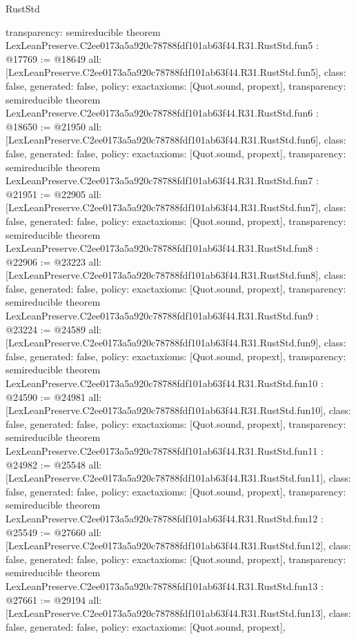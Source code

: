 \begin{lexlean}{RustStd}
\begin{coremodule}
{  transparency: semireducible
}
theorem LexLeanPreserve.C2ee0173a5a920c78788fdf101ab63f44.R31.RustStd.fun5 : @17769 := @18649 {
  all: [LexLeanPreserve.C2ee0173a5a920c78788fdf101ab63f44.R31.RustStd.fun5],
  class: false,
  generated: false,
  policy: exact{axioms: [Quot.sound, propext]},
  transparency: semireducible
}
theorem LexLeanPreserve.C2ee0173a5a920c78788fdf101ab63f44.R31.RustStd.fun6 : @18650 := @21950 {
  all: [LexLeanPreserve.C2ee0173a5a920c78788fdf101ab63f44.R31.RustStd.fun6],
  class: false,
  generated: false,
  policy: exact{axioms: [Quot.sound, propext]},
  transparency: semireducible
}
theorem LexLeanPreserve.C2ee0173a5a920c78788fdf101ab63f44.R31.RustStd.fun7 : @21951 := @22905 {
  all: [LexLeanPreserve.C2ee0173a5a920c78788fdf101ab63f44.R31.RustStd.fun7],
  class: false,
  generated: false,
  policy: exact{axioms: [Quot.sound, propext]},
  transparency: semireducible
}
theorem LexLeanPreserve.C2ee0173a5a920c78788fdf101ab63f44.R31.RustStd.fun8 : @22906 := @23223 {
  all: [LexLeanPreserve.C2ee0173a5a920c78788fdf101ab63f44.R31.RustStd.fun8],
  class: false,
  generated: false,
  policy: exact{axioms: [Quot.sound, propext]},
  transparency: semireducible
}
theorem LexLeanPreserve.C2ee0173a5a920c78788fdf101ab63f44.R31.RustStd.fun9 : @23224 := @24589 {
  all: [LexLeanPreserve.C2ee0173a5a920c78788fdf101ab63f44.R31.RustStd.fun9],
  class: false,
  generated: false,
  policy: exact{axioms: [Quot.sound, propext]},
  transparency: semireducible
}
theorem LexLeanPreserve.C2ee0173a5a920c78788fdf101ab63f44.R31.RustStd.fun10 : @24590 := @24981 {
  all: [LexLeanPreserve.C2ee0173a5a920c78788fdf101ab63f44.R31.RustStd.fun10],
  class: false,
  generated: false,
  policy: exact{axioms: [Quot.sound, propext]},
  transparency: semireducible
}
theorem LexLeanPreserve.C2ee0173a5a920c78788fdf101ab63f44.R31.RustStd.fun11 : @24982 := @25548 {
  all: [LexLeanPreserve.C2ee0173a5a920c78788fdf101ab63f44.R31.RustStd.fun11],
  class: false,
  generated: false,
  policy: exact{axioms: [Quot.sound, propext]},
  transparency: semireducible
}
theorem LexLeanPreserve.C2ee0173a5a920c78788fdf101ab63f44.R31.RustStd.fun12 : @25549 := @27660 {
  all: [LexLeanPreserve.C2ee0173a5a920c78788fdf101ab63f44.R31.RustStd.fun12],
  class: false,
  generated: false,
  policy: exact{axioms: [Quot.sound, propext]},
  transparency: semireducible
}
theorem LexLeanPreserve.C2ee0173a5a920c78788fdf101ab63f44.R31.RustStd.fun13 : @27661 := @29194 {
  all: [LexLeanPreserve.C2ee0173a5a920c78788fdf101ab63f44.R31.RustStd.fun13],
  class: false,
  generated: false,
  policy: exact{axioms: [Quot.sound, propext]},
}
\end{coremodule}
\end{lexlean}
